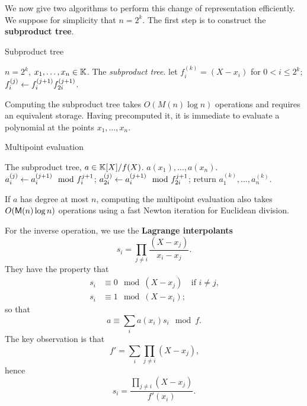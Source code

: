 We now give two algorithms to perform this change of representation
efficiently. We suppose for simplicity that $n=2^k$. The first step is
to construct the \textbf{subproduct tree}.

\begin{algorithm}
  \caption{\label{alg:subprod}Subproduct tree}
  \begin{algorithmic}[1]
    \REQUIRE $n=2^k$, $x_1,\ldots,x_n\in\mathbb{K}$.
    \ENSURE The \emph{subproduct tree}.
    \STATE let $f_i^{(k)}=(X-x_i)$ for $0<i\le2^k$;
    \STATE $f^{(j)}_i \leftarrow f^{(j+1)}_if^{(j+1)}_{2i}$.
    \ENDFOR
    \ENDFOR
  \end{algorithmic}
\end{algorithm}

Computing the subproduct tree takes $O(M(n)\log n)$ operations and
requires an equivalent storage. Having precomputed it, it is immediate
to evaluate a polynomial at the points $x_1,\ldots,x_n$.

\begin{algorithm}
  \caption{Multipoint evaluation}
  \begin{algorithmic}[1]
    \REQUIRE The subproduct tree, $a\in\mathbb{K}[X]/f(X)$.
    \ENSURE $a(x_1),\ldots,a(x_n)$.
    \STATE $a_i^{(j)} \leftarrow a_i^{(j+1)} \mod f_{i}^{j+1}$;
    \STATE $a_{2i}^{(j)} \leftarrow a_i^{(j+1)} \mod f_{2i}^{j+1}$;
    \ENDFOR
    \ENDFOR
    \STATE return $a_1^{(k)},\ldots,a_n^{(k)}$.
  \end{algorithmic}
\end{algorithm}

If $a$ has degree at most $n$, computing the multipoint evaluation
also takes $O(\mathsf{M}(n)\log n)$ operations using a fast Newton
iteration for Euclidean division.

For the inverse operation, we use the
\textbf{Lagrange interpolants} 
\begin{equation}
  \label{eq:223}
  s_i = \prod_{j\ne i}\frac{(X-x_j)}{x_i-x_j}
  \text{.}
\end{equation}
They have the property that
\begin{equation}
  \label{eq:224}
  \begin{aligned}
    s_i &\equiv 0 \mod (X-x_j) &\text{if $i\ne j$,}\\
    s_i &\equiv 1 \mod (X-x_i)\text{;}
  \end{aligned}
\end{equation}
so that
\begin{equation}
  \label{eq:225}
  a \equiv \sum_i a(x_i)s_i \mod f
  \text{.}
\end{equation}
The key observation is that
\begin{equation}
  \label{eq:226}
  f' = \sum_{i}\prod_{j\ne i}(X-x_j)
  \text{,}
\end{equation}
hence
\begin{equation}
  \label{eq:227}
  s_i = \frac{\prod_{j\ne i}(X-x_j)}{f'(x_i)}
  \text{.}
\end{equation}


